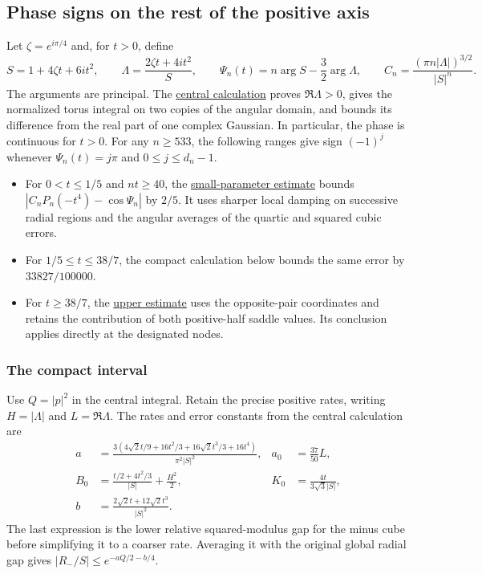 \documentclass[11pt]{article}
\begin{document}
\subsection{Phase signs on the rest of the positive axis}
\label{sec:phase-signs-on-the-rest-of-the-positive-axis}

Let $\zeta=e^{i\pi/4}$ and, for $t>0$, define
\[
S=1+4\zeta t+6it^2,\qquad
\Lambda=\frac{2\zeta t+4it^2}{S},\qquad
\Psi_n(t)=n\arg S-\frac32\arg\Lambda,\qquad
C_n=\frac{(\pi n|\Lambda|)^{3/2}}{|S|^n}.
\]
The arguments are principal. The \hyperref[sec:central]{central calculation} proves $\Re\Lambda>0$, gives the normalized torus integral on two copies of the angular domain, and bounds its difference from the real part of one complex Gaussian. In particular, the phase is continuous for $t>0$. For any $n\ge533$, the following ranges give sign $(-1)^j$ whenever $\Psi_n(t)=j\pi$ and $0\le j\le d_n-1$.

\begin{itemize}
\renewcommand{\labelitemi}{$\bullet$}
\item For $0<t\le1/5$ and $nt\ge40$, the \hyperref[sec:small]{small-parameter estimate} bounds $|C_nP_n(-t^4)-\cos\Psi_n|$ by $2/5$. It uses sharper local damping on successive radial regions and the angular averages of the quartic and squared cubic errors.
\item For $1/5\le t\le38/7$, the compact calculation below bounds the same error by $33827/100000$.
\item For $t\ge38/7$, the \hyperref[sec:upper]{upper estimate} uses the opposite-pair coordinates and retains the contribution of both positive-half saddle values. Its conclusion applies directly at the designated nodes.
\end{itemize}

\subsubsection{The compact interval}
\label{sec:the-compact-interval}

Use $Q=|p|^2$ in the central integral. Retain the precise positive rates, writing $H=|\Lambda|$ and $L=\Re\Lambda$. The rates and error constants from the central calculation are
\[
\begin{aligned}
a&=\frac{3(4\sqrt2t/9+16t^2/3+16\sqrt2t^3/3+16t^4)}{\pi^2|S|^2},
& a_0&=\frac{37}{50}L,\\
B_0&=\frac{t/2+4t^2/3}{|S|}+\frac{H^2}{2},
&K_0&=\frac{4t}{3\sqrt3|S|},\\
b&=\frac{2\sqrt2t+12\sqrt2t^3}{|S|^2}.
\end{aligned}
\]
The last expression is the lower relative squared-modulus gap for the minus cube before simplifying it to a coarser rate. Averaging it with the original global radial gap gives $|R_-/S|\le e^{-aQ/2-b/4}$.
\end{document}
